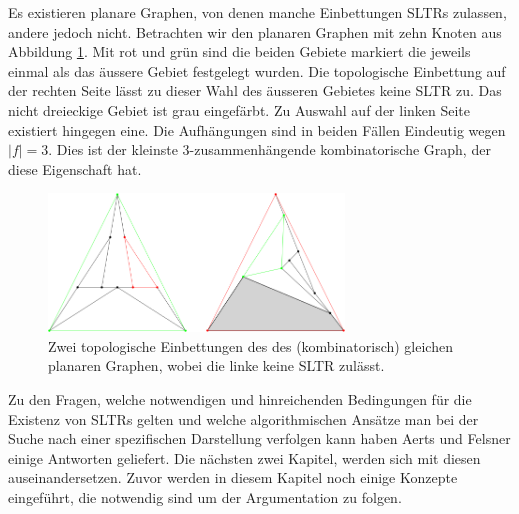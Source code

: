 \begin{example}\label{bsp1}
Es existieren planare Graphen, von denen manche Einbettungen SLTRs zulassen, andere jedoch nicht. Betrachten wir den planaren Graphen mit zehn Knoten aus Abbildung \ref{10_example}. Mit rot und grün sind die beiden Gebiete markiert die jeweils einmal als das äussere Gebiet festgelegt wurden. Die topologische Einbettung auf der rechten Seite lässt zu dieser Wahl des äusseren Gebietes keine SLTR zu. Das nicht dreieckige Gebiet ist grau eingefärbt. Zu Auswahl auf der linken Seite existiert hingegen eine. Die Aufhängungen sind in beiden Fällen Eindeutig wegen $|f|=3$. Dies ist der kleinste 3-zusammenhängende kombinatorische Graph, der diese Eigenschaft hat.

\begin{figure}[h]
\centering
\includegraphics[width=0.7\textwidth]{10_example.png}
\caption{Zwei topologische Einbettungen des des (kombinatorisch) gleichen planaren Graphen, wobei die linke keine SLTR zulässt.}
\label{10_example}
\end{figure}

\end{example}

Zu den Fragen, welche notwendigen und hinreichenden Bedingungen für die Existenz von SLTRs gelten und welche algorithmischen Ansätze man bei der Suche nach einer spezifischen Darstellung verfolgen kann haben Aerts und Felsner einige Antworten geliefert. Die nächsten zwei Kapitel, werden sich mit diesen auseinandersetzen. Zuvor werden in diesem Kapitel noch einige Konzepte eingeführt, die notwendig sind um der Argumentation zu folgen.